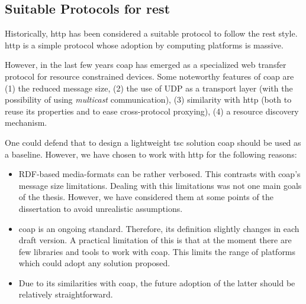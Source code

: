 


\subsection{Suitable Protocols for \ac{rest}}
\label{sec:protocols}


Historically, \acf{http} has been considered a suitable protocol to follow the \ac{rest} style. %
\ac{http} is a simple protocol whose adoption by computing platforms is massive.


However, in the last few years \acf{coap} has emerged as a specialized web transfer protocol for resource constrained devices. %
Some noteworthy features of \ac{coap} are
(1) the reduced message size,
(2) the use of UDP as a transport layer (with the possibility of using \emph{multicast} communication),
(3) similarity with \ac{http} (both to reuse its properties and to ease cross-protocol proxying),
(4) a resource discovery mechanism. %


One could defend that to design a lightweight \ac{tsc} solution \ac{coap} should be used as a baseline.
However, we have chosen to work with \ac{http} for the following reasons:
\begin{itemize}
  \item RDF-based media-formats can be rather verbosed.
	This contrasts with \ac{coap}'s message size limitations.
	Dealing with this limitations was not one main goals of the thesis.
	However, we have considered them at some points of the dissertation to avoid unrealistic assumptions.
  \item \ac{coap} is an ongoing standard.
        Therefore, its definition slightly changes in each draft version.
        A practical limitation of this is that at the moment there are few libraries
        and tools to work with \ac{coap}.
        This limits the range of platforms which could adopt any solution proposed.
  \item Due to its similarities with \ac{coap}, the future adoption of the latter should be relatively straightforward.
\end{itemize}

